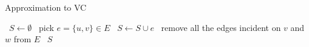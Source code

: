 \begin{algorithm}
    \caption{Approximation to VC}\label{alg:maxmatching}
    \begin{algorithmic}%
        \State~$S \gets \emptyset$
            \State~pick $e = \{u,v\} \in E$
            \State~$S \gets S \cup e$
            \State~remove all the edges incident on $v$ and $w$ from $E$
        \EndWhile
        \State\Return~$S$
        \EndProcedure
    \end{algorithmic}
\end{algorithm}